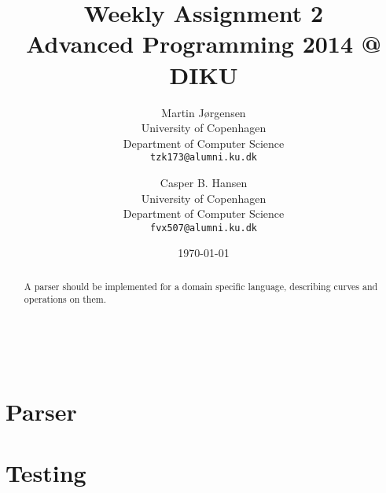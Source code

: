 \documentclass[a4paper,11pt]{article}
\title
{
    {\Large Weekly Assignment 2} \\
    Advanced Programming 2014 @ DIKU
}
\author
{
    Martin Jørgensen \\
    University of Copenhagen \\
    Department of Computer Science \\
    {\tt tzk173@alumni.ku.dk}
    \and
    Casper B. Hansen \\
    University of Copenhagen \\
    Department of Computer Science \\
    {\tt fvx507@alumni.ku.dk}
}
\date{\today}
\begin{document}
\maketitle
\thispagestyle{empty}
\begin{multicols}{2}
    \begin{abstract}
      A parser should be implemented for a domain specific language,
      describing curves and operations on them.
    \end{abstract}
    \vfill{\ }\columnbreak
    \tableofcontents
\end{multicols}
\clearpage

\section{Parser}

\section{Testing}
\end{document}
